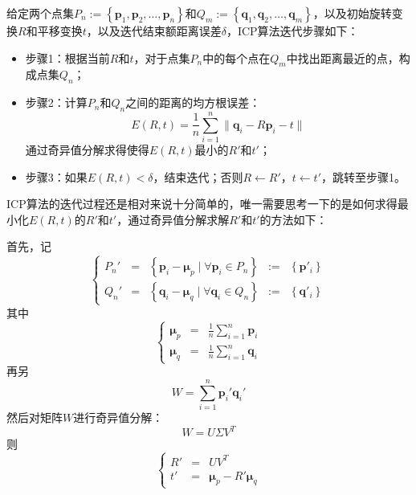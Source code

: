 给定两个点集$P_n:=\left\{\mathbf{p}_1,\mathbf{p}_2,\ldots,\mathbf{p}_n\right\}$和$Q_m:=\left\{\mathbf{q}_1,\mathbf{q}_2,\ldots,\mathbf{q}_m\right\}$，以及初始旋转变换$R$和平移变换$t$，以及迭代结束额距离误差$\delta$，ICP算法迭代步骤如下：
\begin{itemize}
\item {\kai 步骤1：}根据当前$R$和$t$，对于点集$P_n$中的每个点在$Q_m$中找出距离最近的点，构成点集$Q_n$；
\item {\kai 步骤2：}计算$P_n$和$Q_n$之间的距离的均方根误差：
  \begin{equation}
    E(R,t) = \frac{1}{n}\sum_{i=1}^n{\parallel \mathbf{q}_i - R\mathbf{p}_i - t\parallel}
  \end{equation}
  通过奇异值分解求得使得$E(R,t)$最小的$R'$和$t'$；
\item {\kai 步骤3：}如果$E(R,t) < \delta$，结束迭代；否则$R\leftarrow R'$，$t\leftarrow t'$，跳转至步骤1。
\end{itemize}

ICP算法的迭代过程还是相对来说十分简单的，唯一需要思考一下的是如何求得最小化$E(R,t)$的$R'$和$t'$，通过奇异值分解求解$R'$和$t'$的方法如下：

首先，记
\begin{equation}
  \left\{
  \begin{array}{ccccc}
  P_n'& = &\left\{\mathbf{p}_i-\mathbf{\mu}_p \;|\; \forall \mathbf{p}_i \in P_n\right\}&:=&\left\{\mathbf{p}'_i\right\}\\
  Q_n'& = &\left\{\mathbf{q}_i-\mathbf{\mu}_q \;|\; \forall \mathbf{q}_i \in Q_n\right\}&:=&\left\{\mathbf{q}'_i\right\}
  \end{array}
  \right.
\end{equation}
其中
\begin{equation}
  \left\{
    \begin{array}{ccc}
      \mathbf{\mu}_p&=&\frac{1}{n}\sum_{i=1}^n{\mathbf{p}_i}\\
      \mathbf{\mu}_q&=&\frac{1}{n}\sum_{i=1}^n{\mathbf{q}_i}
    \end{array}
  \right.
\end{equation}
再另
\begin{equation}
  W = \sum_{i=1}^n{\mathbf{p}_i'\mathbf{q}_i'}
\end{equation}
然后对矩阵$W$进行奇异值分解：
\begin{equation}
  W = U\Sigma V^T
\end{equation}
则
\begin{equation}
  \left\{
    \begin{array}{ccc}
      R'&=&UV^T \\
        t'&=&\mathbf{\mu}_p-R'\mathbf{\mu}_q
    \end{array}
    \right.
\end{equation}

